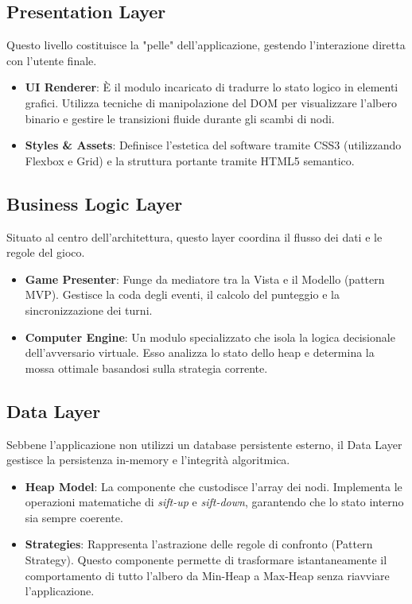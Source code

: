 \documentclass[openany]{theme/uniprthesis}
\begin{document}
\subsection{Presentation Layer}
Questo livello costituisce la "pelle" dell'applicazione, gestendo l'interazione diretta con l'utente finale.
\begin{itemize}
    \item \textbf{UI Renderer}: È il modulo incaricato di tradurre lo stato logico in elementi grafici. Utilizza tecniche di manipolazione del DOM per visualizzare l'albero binario e gestire le transizioni fluide durante gli scambi di nodi.
    \item \textbf{Styles \& Assets}: Definisce l'estetica del software tramite CSS3 (utilizzando Flexbox e Grid) e la struttura portante tramite HTML5 semantico.
\end{itemize}

\subsection{Business Logic Layer}
Situato al centro dell'architettura, questo layer coordina il flusso dei dati e le regole del gioco.
\begin{itemize}
    \item \textbf{Game Presenter}: Funge da mediatore tra la Vista e il Modello (pattern MVP). Gestisce la coda degli eventi, il calcolo del punteggio e la sincronizzazione dei turni.
    \item \textbf{Computer Engine}: Un modulo specializzato che isola la logica decisionale dell'avversario virtuale. Esso analizza lo stato dello heap e determina la mossa ottimale basandosi sulla strategia corrente.
\end{itemize}

\subsection{Data Layer}
Sebbene l'applicazione non utilizzi un database persistente esterno, il Data Layer gestisce la persistenza in-memory e l'integrità algoritmica.
\begin{itemize}
    \item \textbf{Heap Model}: La componente che custodisce l'array dei nodi. Implementa le operazioni matematiche di \textit{sift-up} e \textit{sift-down}, garantendo che lo stato interno sia sempre coerente.
    \item \textbf{Strategies}: Rappresenta l'astrazione delle regole di confronto (Pattern Strategy). Questo componente permette di trasformare istantaneamente il comportamento di tutto l'albero da Min-Heap a Max-Heap senza riavviare l'applicazione.
\end{itemize}
\end{document}
